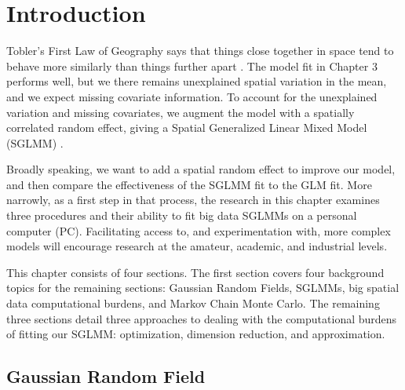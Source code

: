 
\section{Introduction} %

Tobler's First Law of Geography says that things close together in space tend to behave more similarly than things further apart \citep{Tobler1970}. The model fit in Chapter 3 performs well, but we there remains unexplained spatial variation in the mean, and we expect missing covariate information. To account for the unexplained variation and missing covariates, we augment the model with a spatially correlated random effect, giving a Spatial Generalized Linear Mixed Model (SGLMM) \citep{Banerjee2008}.

Broadly speaking, we want to add a spatial random effect to improve our model, and then compare the effectiveness of the SGLMM fit to the GLM fit. More narrowly, as a first step in that process, the research in this chapter examines three procedures and their ability to fit big data SGLMMs on a personal computer (PC). Facilitating access to, and experimentation with, more complex models will encourage research at the amateur, academic, and industrial levels.

This chapter consists of four sections. The first section covers four background topics for the remaining sections: Gaussian Random Fields, SGLMMs, big spatial data computational burdens, and Markov Chain Monte Carlo. The remaining three sections detail three approaches to dealing with the computational burdens of fitting our SGLMM: optimization, dimension reduction, and approximation.

\subsection{Gaussian Random Field} %

